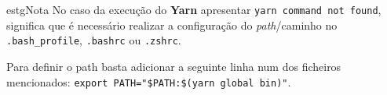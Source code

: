 \begin{mybox}{estg}{Nota}
	No caso da execução do \textbf{Yarn} apresentar \verb|yarn command not found|, significa que é necessário realizar a configuração do \textit{path}/caminho no \verb|.bash_profile|, \verb|.bashrc| ou \verb|.zshrc|.
	
	\vspace{5pt}
	
	Para definir o path basta adicionar a seguinte linha num dos ficheiros mencionados: \verb|export PATH="$PATH:$(yarn global bin)"|.
\end{mybox}